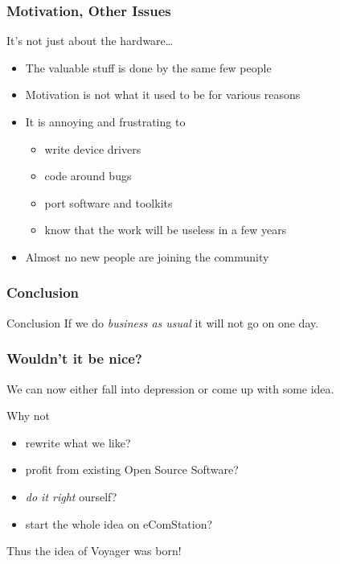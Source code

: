 \documentclass{beamer}
\begin{document}
\begin{frame}
\frametitle{Motivation, Other Issues}
It's not just about the hardware\ldots
\begin{itemize}[<+->]
  \item The valuable stuff is done by the same few people
  \item Motivation is not what it used to be for various reasons
  \item It is annoying and frustrating to
  \begin{itemize}[<+->]
    \item write device drivers
    \item code around bugs
    \item port software and toolkits
    \item know that the work will be useless in a few years
  \end{itemize}
  \item Almost no new people are joining the community
\end{itemize}
\end{frame}

\begin{frame}
\frametitle{Conclusion}
\begin{block}{Conclusion}
If we do \textit{business as usual} it will not go on one day.
\end{block}
\end{frame}

\begin{frame}
\frametitle{Wouldn't it be nice?}
We can now either fall into depression or come up with some idea.

Why not
\begin{itemize}[<+->]
  \item rewrite what we like?
  \item profit from existing Open Source Software?
  \item \textit{do it right} ourself?
  \item start the whole idea on eComStation?
\end{itemize}
Thus the idea of Voyager was born!
\end{frame}
\end{document}
